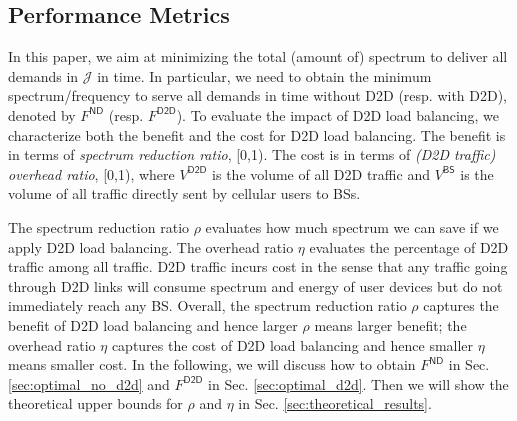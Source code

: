 \subsection{Performance Metrics} \label{sec:performance_metrics}
In this paper, we aim at minimizing the total (amount of) spectrum to deliver all demands in $\mathcal{J}$ in time.
In particular, we need to obtain the minimum spectrum/frequency to serve all demands in time without D2D (resp. with D2D), denoted by $F^{\textsf{ND}}$
(resp. $F^{\textsf{D2D}}$).
To evaluate the impact of D2D load balancing, we characterize both the benefit and the cost for D2D load balancing.
The benefit is in terms of \emph{spectrum reduction ratio},
\be
\rho \triangleq {}\in [0,1).
\label{equ:spectrum-reduction-ratio}
\ee
The cost is in terms of  \emph{(D2D traffic) overhead ratio},
\be
\eta \triangleq {}\in [0,1),
\label{equ:overhead-ratio}
\ee
where $V^{\textsf{D2D}}$ is the volume of all D2D traffic and $V^{\textsf{BS}}$
is the volume of all traffic directly sent by cellular users to BSs.

The spectrum reduction ratio $\rho$ evaluates how much spectrum we can save if we apply D2D load balancing.
The overhead ratio $\eta$ evaluates the percentage of D2D traffic among all traffic.
D2D traffic incurs cost in the sense that any traffic going through D2D links
will consume spectrum and energy of user devices but do not immediately reach any BS.
Overall, the spectrum reduction ratio $\rho$ captures
the benefit of D2D load balancing and hence larger $\rho$ means larger benefit;
the overhead ratio $\eta$ captures the cost of D2D load balancing
and hence smaller $\eta$ means smaller cost.
In the following, we will discuss how to obtain $F^{\textsf{ND}}$ in Sec. \ref{sec:optimal_no_d2d}
and $F^\textsf{D2D}$ in Sec. \ref{sec:optimal_d2d}.
Then we will show the theoretical upper bounds for $\rho$ and $\eta$ in Sec. \ref{sec:theoretical_results}.
